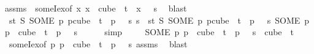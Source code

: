 \begin{isabellebody}
\ assms\ {}\ someI{\isacharunderscore}{\kern0pt}ex{\isacharbrackleft}{\kern0pt}of\ {\isachardoublequoteopen}{\isasymlambda}x{\isachardot}{\kern0pt}\ x\ {\isasymin}\ cube\ {}\ t\ {\isasymand}\ x\ {}\ {\isacharequal}{\kern0pt}\ s{\isachardoublequoteclose}{\isacharbrackright}{\kern0pt}\ \isamarkupfalse%
\ blast\ \isanewline
\ \ \isamarkupfalse%
\ {}{\isacharcolon}{\kern0pt}\ {\isachardoublequoteopen}{\isacharparenleft}{\kern0pt}{\isasymlambda}s{\isasymin}{\isacharbraceleft}{\kern0pt}{\isachardot}{\kern0pt}{\isachardot}{\kern0pt}{\isacharless}{\kern0pt}t{\isacharbraceright}{\kern0pt}{\isachardot}{\kern0pt}\ S\ {\isacharparenleft}{\kern0pt}SOME\ p{\isachardot}{\kern0pt}\ p{\isasymin}cube\ {}\ t\ {\isasymand}\ p\ {}\ {\isacharequal}{\kern0pt}\ s{\isacharparenright}{\kern0pt}{\isacharparenright}{\kern0pt}\ s\ {\isacharequal}{\kern0pt}\ {\isacharparenleft}{\kern0pt}{\isasymlambda}s{\isasymin}{\isacharbraceleft}{\kern0pt}{\isachardot}{\kern0pt}{\isachardot}{\kern0pt}{\isacharless}{\kern0pt}t{\isacharbraceright}{\kern0pt}{\isachardot}{\kern0pt}\ S\ {\isacharparenleft}{\kern0pt}SOME\ p{\isachardot}{\kern0pt}\ p{\isasymin}cube\ {}\ t\ {\isasymand}\ p\ {}\ {\isacharequal}{\kern0pt}\ s{\isacharparenright}{\kern0pt}{\isacharparenright}{\kern0pt}\ {\isacharparenleft}{\kern0pt}{\isacharparenleft}{\kern0pt}SOME\ p{\isachardot}{\kern0pt}\ p\ {\isasymin}\ cube\ {}\ t\ {\isasymand}\ p\ {}\ {\isacharequal}{\kern0pt}\ s{\isacharparenright}{\kern0pt}\ {}{\isacharparenright}{\kern0pt}{\isachardoublequoteclose}\ \isamarkupfalse%
\ {}\ \isamarkupfalse%
\ simp\isanewline
\ \ \isamarkupfalse%
\ {}{\isacharcolon}{\kern0pt}\ {\isachardoublequoteopen}{\isacharparenleft}{\kern0pt}SOME\ p{\isachardot}{\kern0pt}\ p\ {\isasymin}\ cube\ {}\ t\ {\isasymand}\ p\ {}\ {\isacharequal}{\kern0pt}\ s{\isacharparenright}{\kern0pt}\ {\isasymin}\ cube\ {}\ t{\isachardoublequoteclose}\ \isamarkupfalse%
\ {}\ someI{\isacharunderscore}{\kern0pt}ex{\isacharbrackleft}{\kern0pt}of\ {\isachardoublequoteopen}{\isasymlambda}p{\isachardot}{\kern0pt}\ p\ {\isasymin}\ cube\ {}\ t\ {\isasymand}\ p\ {}\ {\isacharequal}{\kern0pt}\ s{\isachardoublequoteclose}{\isacharbrackright}{\kern0pt}\ assms\ \isamarkupfalse%
\ blast\isanewline
{}\isamarkupfalse%
%
\endisatagproof

\end{isabellebody}
